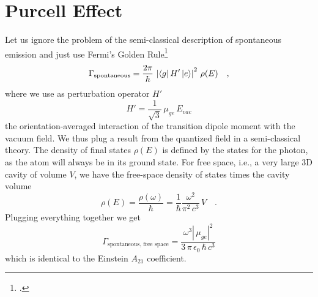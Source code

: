 \section{Purcell Effect}

Let us ignore the problem of the semi-classical description of spontaneous emission and just use Fermi's Golden Rule\footcite[chapter 10.3]{Fox}
\begin{equation}
 \Gamma_\text{spontaneous} = \frac{2 \pi}{\hbar} \, \left| \bra{g} H' \ket{e} \right|^2 \, \rho(E) \quad ,
\end{equation}
where we use as perturbation operator $H'$ 
\begin{equation}
H' = \frac{1}{\sqrt{3}} \, \mu_{ge} \, E_{vac}
\end{equation}
the orientation-averaged interaction of the transition dipole moment with the vacuum field. We thus plug a result from the quantized field in a semi-classical theory.
The density of final states $\rho(E)$ is defined by the states for the photon, as the atom will always be in its ground state. For free space, i.e., a very large 3D cavity of volume $V$, we have the free-space density of states  times the cavity volume
\begin{equation}
 \rho(E) = \frac{\rho(\omega) }{\hbar } = \frac{1}{\hbar} \frac{\omega^2}{ \pi^2 \, c^3 } \, V \quad .
\end{equation}
Plugging everything together we get
%
\begin{equation}
 \Gamma_\text{spontaneous, free space} =  \frac{\omega^3  \left| \, \mu_{ge} \right|^2   }{ 3\, \pi  \, \epsilon_0 \, \hbar \, c^3   } 
\end{equation}
which is identical to the Einstein $A_{21}$ coefficient.

